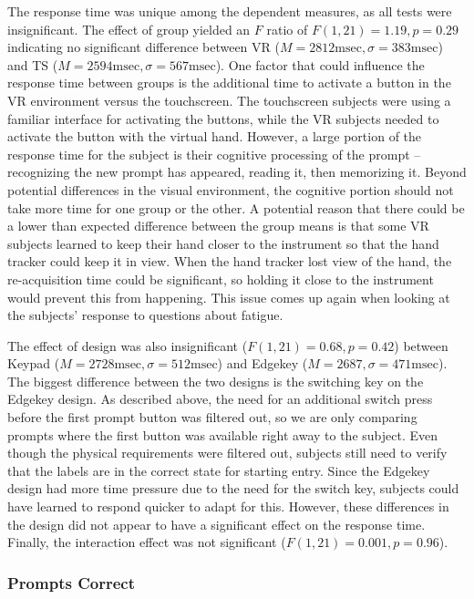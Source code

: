 The response time was unique among the dependent measures, as all tests were insignificant.
The effect of group yielded an $F$ ratio of $F(1, 21) = 1.19, p = 0.29$ indicating no significant difference between VR ($M = 2812\mathrm{msec}, \sigma = 383\mathrm{msec}$) and TS ($M = 2594\mathrm{msec}, \sigma = 567\mathrm{msec}$).
One factor that could influence the response time between groups is the additional time to activate a button in the VR environment versus the touchscreen.
The touchscreen subjects were using a familiar interface for activating the buttons, while the VR subjects needed to activate the button with the virtual hand.
However, a large portion of the response time for the subject is their cognitive processing of the prompt -- recognizing the new prompt has appeared, reading it, then memorizing it.
Beyond potential differences in the visual environment, the cognitive portion should not take more time for one group or the other.
A potential reason that there could be a lower than expected difference between the group means is that some VR subjects learned to keep their hand closer to the instrument so that the hand tracker could keep it in view.
When the hand tracker lost view of the hand, the re-acquisition time could be significant, so holding it close to the instrument would prevent this from happening.
This issue comes up again when looking at the subjects' response to questions about fatigue.

The effect of design was also insignificant ($F(1, 21) = 0.68, p = 0.42$) between Keypad ($M=2728\mathrm{msec}, \sigma=512\mathrm{msec}$) and Edgekey ($M=2687, \sigma=471\mathrm{msec}$).
The biggest difference between the two designs is the switching key on the Edgekey design.
As described above, the need for an additional switch press before the first prompt button was filtered out, so we are only comparing prompts where the first button was available right away to the subject.
Even though the physical requirements were filtered out, subjects still need to verify that the labels are in the correct state for starting entry.
Since the Edgekey design had more time pressure due to the need for the switch key, subjects could have learned to respond quicker to adapt for this.
However, these differences in the design did not appear to have a significant effect on the response time.
Finally, the interaction effect was not significant ($F(1, 21) = 0.001, p = 0.96$).

\subsubsection{Prompts Correct}

